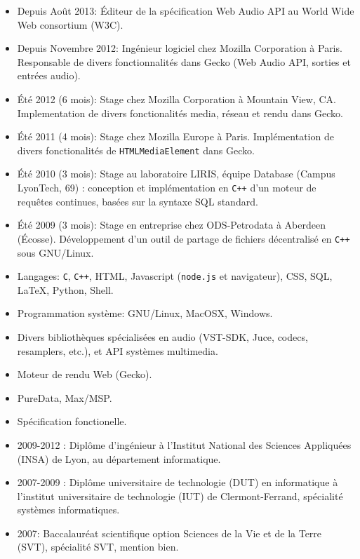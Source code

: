 \begin{itemize}
  \item Depuis Août 2013: Éditeur de la spécification Web Audio API au World
    Wide Web consortium (W3C).
  \item Depuis Novembre 2012: Ingénieur logiciel chez Mozilla Corporation à
    Paris. Responsable de divers fonctionnalités dans Gecko (Web Audio API,
    sorties et entrées audio).
  \item Été 2012 (6 mois): Stage chez Mozilla Corporation à Mountain View, CA.
    Implementation de divers fonctionalités media, réseau et rendu dans Gecko.
  \item Été 2011 (4 mois): Stage chez Mozilla Europe à Paris. Implémentation de
    divers fonctionalités de {\tt HTMLMediaElement} dans Gecko.
  \item Été 2010 (3 mois): Stage au laboratoire LIRIS, équipe Database (Campus
    LyonTech, 69) : conception et implémentation en \texttt{C++} d'un moteur de
    requêtes continues, basées sur la syntaxe SQL standard.
      \item Été 2009 (3 mois): Stage en entreprise chez ODS-Petrodata à Aberdeen (Écosse). Développement d'un outil de partage de fichiers décentralisé en {\tt C++} sous GNU/Linux.
\end{itemize}
\begin{itemize}
  \item Langages: {\tt C}, {\tt C++}, HTML, Javascript ({\tt node.js} et
    navigateur), CSS, SQL, \LaTeX{}, Python, Shell.
    \item Programmation système: GNU/Linux, MacOSX, Windows.
    \item Divers bibliothèques spécialisées en audio (VST-SDK, Juce, codecs,
      resamplers, etc.), et API systèmes multimedia.
    \item Moteur de rendu Web (Gecko).
    \item PureData, Max/MSP.
    \item Spécification fonctionelle.
\end{itemize}
\begin{itemize}
    \item 2009-2012 : Diplôme d'ingénieur à l'Institut National des Sciences Appliquées (INSA) de Lyon, au département informatique.
    \item 2007-2009 : Diplôme universitaire de technologie (DUT) en informatique à l'institut universitaire de technologie (IUT) de Clermont-Ferrand, spécialité systèmes informatiques.
    \item 2007: Baccalauréat scientifique option Sciences de la Vie et de la
    Terre (SVT), spécialité SVT, mention bien.
\end{itemize}
